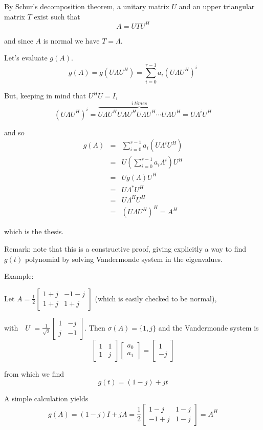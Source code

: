 \documentclass[12pt]{article}
\begin{document}
By Schur's decomposition theorem, a unitary matrix $U$ and an upper
triangular matrix $T$ exist such that%
\begin{equation*}
A=UTU^{H}
\end{equation*}

and since $A$ is normal we have $T=\Lambda $.

Let's evaluate $g(A)$.%
\begin{equation*}
g(A)=g(U\Lambda U^{H})=\sum_{i=0}^{r-1}a_{i}(U\Lambda U^{H})^{i}
\end{equation*}

But, keeping in mind that $U^{H}U=I$,
\begin{equation*}
(U\Lambda U^{H})^{i}=\overset{i\ times}{\overbrace{U\Lambda U^{H}U\Lambda
U^{H}U\Lambda U^{H} \cdots U\Lambda U^{H}}}=U\Lambda ^{i}U^{H}
\end{equation*}

and so
\begin{eqnarray*}
g(A) &=&\sum_{i=0}^{r-1}a_{i}(U\Lambda ^{i}U^{H}) \\
&=&U\left( \sum_{i=0}^{r-1}a_{i}\Lambda ^{i}\right) U^{H} \\
&=&Ug(\Lambda )U^{H} \\
&=&U\Lambda ^{\ast }U^{H} \\
&=&U\Lambda ^{H}U^{H} \\
&=&(U\Lambda U^{H})^{H}=A^{H}
\end{eqnarray*}

which is the thesis.


Remark: note that this is a constructive proof, giving explicitly a way to
find $g(t)$ polynomial by solving Vandermonde system in the eigenvalues.

Example:

Let  $A=\frac{1}{2}%
\begin{bmatrix}
1+j & -1-j \\ 
1+j & 1+j%
\end{bmatrix}%
$ (which is easily checked to be normal),

with\ \ $U$ $=\frac{1}{\sqrt{2}}%
\begin{bmatrix}
1 & -j \\ 
j & -1%
\end{bmatrix}%
$. Then $\sigma (A)=\{1,j\}$ and the Vandermonde system is%
\[
\begin{bmatrix}
1 & 1 \\ 
1 & j%
\end{bmatrix}%
\begin{bmatrix}
a_{0} \\ 
a_{1}%
\end{bmatrix}%
=%
\begin{bmatrix}
1 \\ 
-j%
\end{bmatrix}%
\]

from which we find%
\[
g(t)=(1-j)+jt
\]

A simple calculation yields%
\[
g(A)=(1-j)I+jA=\frac{1}{2}%
\begin{bmatrix}
1-j & 1-j \\ 
-1+j & 1-j%
\end{bmatrix}%
=A^{H}
\]
\end{document}
